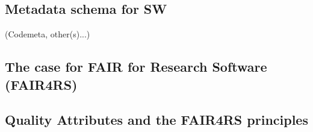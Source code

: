 \subsection{Metadata schema for SW}

(Codemeta, other(s)...)

\subsection{The case for FAIR for Research Software (FAIR4RS)}

\subsection{Quality Attributes and the FAIR4RS principles}


